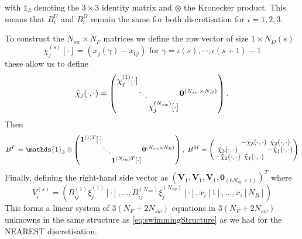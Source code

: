 with $\mathds{1}_{3}$ denoting the $3\times3$ identity matrix and $\otimes$ the Kronecker product. This means that $B^U_i$ and $B_i^\Omega$ remain the same for both discretisation for $i=1,2,3$. 

To construct the $N_{sw} \times N_F$ matrices we define the row vector of size $1 \times N_D(s)$ 
\begin{equation*}
    \chi_j^{(s)}[\cdot] = (x_j(\gamma) - x_{0 j}) \text{ for } \gamma = \iota(s),\cdots,\iota(s+1)-1
\end{equation*}
these allow us to define
\begin{equation*}
\arraycolsep=0.4pt\def\arraystretch{0.8}
    \tilde{\chi}_j(\cdot,\cdot)=\left(\begin{array}{cc}
         \begin{array}{ccc}
             \chi_j^{(1)}[\cdot] & & \\
              & \ddots & \\
              & & \chi_j^{(N_{sw})}[\cdot]
         \end{array} & \bm{0}^{(N_{sw} \times N_B)}
    \end{array}\right).
\end{equation*}
Then
\begin{equation*}
\arraycolsep=0.4pt\def\arraystretch{0.8}
    B^F = \mathds{1}_{3} \otimes \left(\begin{array}{cc}
         \begin{array}{ccc}
             \bm{1}^{(1)T}[\cdot] & & \\
              & \ddots & \\
              & & \bm{1}^{(N_{sw})T}[\cdot]
         \end{array} & \bm{0}^{(N_{sw} \times N_B)}
    \end{array}\right), \;
    B^M =
    \left(\begin{array}{ccc}
             & -\tilde{\chi}_3(\cdot,\cdot) & \tilde{\chi}_2(\cdot,\cdot)\\
            \tilde{\chi}_3(\cdot,\cdot) & & -\tilde{\chi}_1(\cdot,\cdot)\\
            -\tilde{\chi}_2(\cdot,\cdot) & \tilde{\chi}_1(\cdot,\cdot) &
          \end{array}\right)
\end{equation*}
Finally, defining the right-hand side vector as $(\bm{V}_1,\bm{V}_1,\bm{V}_1,\bm{0}_{(6N_{sw} \times 1)})^T$ where
\begin{equation*}
    V_i^{(s)} = (B_{ij}^{(1)}\dot{\xi}_j^{(1)}[\cdot],\dots,B_{ij}^{(N_{sw})}\dot{\xi}_j^{(N_{sw})}[\cdot],\dot{x}_i[1],\dots,\dot{x}_i[N_B])
\end{equation*}
This forms a linear system of $3(N_F+2N_{sw})$ equations in $3(N_F+2N_{sw})$ unknowns in the same structure as \cref{eq:swimmingStructure} as we had for the NEAREST discretisation.

